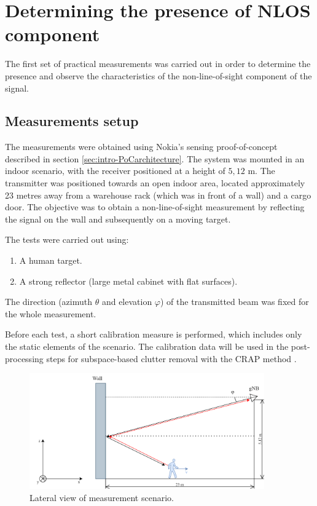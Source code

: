 \chapter{Determining the presence of NLOS component}

The first set of practical measurements was carried out in order to determine the presence and observe the characteristics of the non-line-of-sight component of the signal. 

\section{Measurements setup}
\label{sec:Test1_meas_scenario}

The measurements were obtained using Nokia's sensing proof-of-concept described in section \ref{sec:intro-PoCarchitecture}. The system was mounted in an indoor scenario, with the receiver positioned at a height of $5,12$ m. The transmitter was positioned towards an open indoor area, located approximately 23 metres away from a warehouse rack (which was in front of a wall) and a cargo door.
The objective was to obtain a non-line-of-sight measurement by reflecting the signal on the wall and subsequently on a moving target. 

The tests were carried out using:

\begin{enumerate}
	\item A human target.
	\item A strong reflector (large metal cabinet with flat surfaces).
\end{enumerate}

The direction (azimuth $\theta$ and elevation $\varphi$) of the transmitted beam was fixed for the whole measurement.

Before each test, a short calibration measure is performed, which includes only the static elements of the scenario. The calibration data will be used in the post-processing steps for subspace-based clutter removal with the CRAP method  \cite{Henninger_Mandelli_Grudnitsky_Wild_Brink_2023}. 


\begin{figure}[H]
	\centering
	\includegraphics[width=0.9\textwidth]{Images/Test1/base-lateral_view}
	\caption{Lateral view of measurement scenario.}
	\label{fig:Test1_base-lateral_view}
\end{figure}

